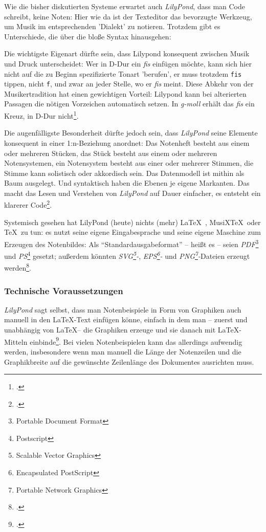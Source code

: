 Wie die bisher diskutierten Systeme erwartet auch \emph{LilyPond}, dass man Code
schreibt, keine Noten: Hier wie da ist der Texteditor das bevorzugte Werkzeug,
um Musik im entsprechenden 'Dialekt' zu notieren. Trotzdem gibt es Unterschiede,
die über die bloße Syntax hinausgehen:

Die wichtigste Eigenart dürfte sein, dass Lilypond konsequent zwischen Musik und
Druck unterscheidet: Wer in D-Dur ein \emph{fis} einfügen möchte, kann sich hier
nicht auf die zu Beginn spezifizierte Tonart 'berufen', er muss trotzdem
\texttt{fis} tippen, nicht \texttt{f}, und zwar an jeder Stelle, wo er
\emph{fis} meint. Diese Abkehr von der Musikertradition hat einen gewichtigen
Vorteil: Lilypond kann bei alterierten Passagen die nötigen Vorzeichen
automatisch setzen. In \emph{g-moll} erhält das \emph{fis} ein Kreuz, in D-Dur
nicht\footcite[vgl.][21]{LilyPond2018b}.

Die augenfälligste Besonderheit dürfte jedoch sein, dass \emph{LilyPond} seine
Elemente konsequent in einer 1:n-Beziehung anordnet: Das Notenheft besteht aus
einem oder mehreren Stücken, das Stück besteht aus einem oder mehreren
Notensystemen, ein Notensystem besteht aus einer oder mehrerer Stimmen, die
Stimme kann solistisch oder akkordisch sein. Das Datenmodell ist mithin als Baum
ausgelegt. Und syntaktisch haben die Ebenen je eigene Markanten. Das macht das
Lesen und Verstehen von \emph{LilyPond} auf Dauer einfacher, es entsteht ein
klarerer Code\footcite[vgl.][40ff]{LilyPond2018b}.

Systemisch gesehen hat LilyPond (heute) nichts (mehr) \LaTeX\ , MusiX\TeX\ oder
\TeX\ zu tun: es nutzt seine eigene Eingabesprache und seine eigene Maschine zum
Erzeugen des Notenbildes: Als \enquote{Standardausgabeformat} -- heißt es --
seien \emph{PDF}\footnote{Portable Document Format} und
\emph{PS}\footnote{Postscript} gesetzt; außerdem könnten
\emph{SVG\footnote{Scalable Vector Graphics}-}, \emph{EPS\footnote{Encapsulated
PostScript}-} und \emph{PNG\footnote{Portable Network Graphics}-}Dateien erzeugt
werden\footcite[vgl.][481]{LilyPond2018c}.

\subsubsection{Technische Voraussetzungen}

\emph{LilyPond} sagt selbst, dass man Notenbeispiele in Form von Graphiken auch
manuell in den \LaTeX-Text einfügen könne, einfach in dem man -- zuerst und
unabhängig von \LaTeX -- die Graphiken erzeuge und sie danach mit \LaTeX-Mitteln
einbinde\footcite[vgl.][20]{LilyPond2018e}. Bei vielen Notenbeispielen kann das
allerdings aufwendig werden, insbesondere wenn man manuell die Länge der
Notenzeilen und die Graphikbreite auf die gewünschte Zeilenlänge des Dokumentes
ausrichten muss. 

